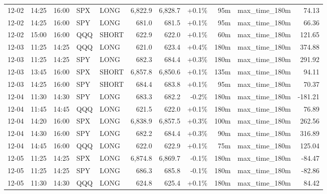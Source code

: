 \documentclass[11pt,a4paper,twoside]{article}
\begin{document}
\begin{center}
\begin{longtable}{>{\color{txtmain}}l l l l l r r r r >{\color{txtmain}}l r}
12-02 & 14:25 & 16:00 & SPX & LONG & 6,822.9 & 6,828.7 & \textcolor{wingreen}{+0.1\%} & 95m & max\_time\_180m & \textcolor{wingreen}{74.13} \\
12-02 & 14:25 & 16:00 & SPY & LONG & 681.0 & 681.5 & \textcolor{wingreen}{+0.1\%} & 95m & max\_time\_180m & \textcolor{wingreen}{66.36} \\
12-02 & 15:00 & 16:00 & QQQ & SHORT & 622.9 & 622.0 & \textcolor{wingreen}{+0.1\%} & 60m & max\_time\_180m & \textcolor{wingreen}{121.65} \\
12-03 & 11:25 & 14:25 & QQQ & LONG & 621.0 & 623.4 & \textcolor{wingreen}{+0.4\%} & 180m & max\_time\_180m & \textcolor{wingreen}{374.88} \\
12-03 & 11:25 & 14:25 & SPY & LONG & 682.3 & 684.4 & \textcolor{wingreen}{+0.3\%} & 180m & max\_time\_180m & \textcolor{wingreen}{291.92} \\
12-03 & 13:45 & 16:00 & SPX & SHORT & 6,857.8 & 6,850.6 & \textcolor{wingreen}{+0.1\%} & 135m & max\_time\_180m & \textcolor{wingreen}{94.11} \\
12-03 & 14:25 & 16:00 & SPY & SHORT & 684.4 & 683.8 & \textcolor{wingreen}{+0.1\%} & 95m & max\_time\_180m & \textcolor{wingreen}{70.37} \\
12-04 & 11:30 & 14:30 & SPY & LONG & 683.3 & 682.2 & \textcolor{lossred}{-0.2\%} & 180m & max\_time\_180m & \textcolor{lossred}{-181.21} \\
12-04 & 11:45 & 14:45 & QQQ & LONG & 621.5 & 622.0 & \textcolor{wingreen}{+0.1\%} & 180m & max\_time\_180m & \textcolor{wingreen}{76.89} \\
12-04 & 14:20 & 16:00 & SPX & LONG & 6,838.9 & 6,857.5 & \textcolor{wingreen}{+0.3\%} & 100m & max\_time\_180m & \textcolor{wingreen}{262.56} \\
12-04 & 14:30 & 16:00 & SPY & LONG & 682.2 & 684.4 & \textcolor{wingreen}{+0.3\%} & 90m & max\_time\_180m & \textcolor{wingreen}{316.89} \\
12-04 & 14:45 & 16:00 & QQQ & LONG & 622.0 & 622.9 & \textcolor{wingreen}{+0.1\%} & 75m & max\_time\_180m & \textcolor{wingreen}{125.04} \\
12-05 & 11:25 & 14:25 & SPX & LONG & 6,874.8 & 6,869.7 & \textcolor{lossred}{-0.1\%} & 180m & max\_time\_180m & \textcolor{lossred}{-84.47} \\
12-05 & 11:25 & 14:25 & SPY & LONG & 686.3 & 685.8 & \textcolor{lossred}{-0.1\%} & 180m & max\_time\_180m & \textcolor{lossred}{-82.86} \\
12-05 & 11:30 & 14:30 & QQQ & LONG & 624.8 & 625.4 & \textcolor{wingreen}{+0.1\%} & 180m & max\_time\_180m & \textcolor{wingreen}{84.42} \\

\end{longtable}
\end{center}
\end{document}
